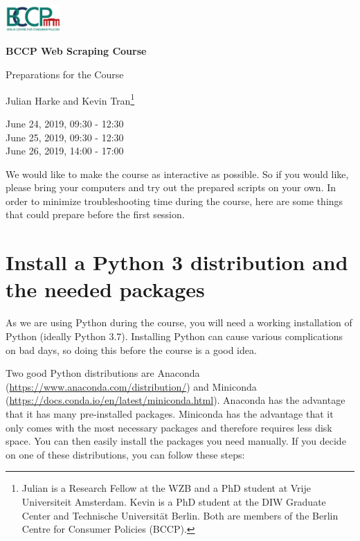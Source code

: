 \documentclass[a4paper]{article}
\begin{document}
\includegraphics[width=80px]{../misc/bccp_logo_transparent.png}
\vspace{1cm}

\begin{center}
\textbf{\Large BCCP Web Scraping Course} 

{\large Preparations for the Course}
\vspace{0.3cm}

Julian Harke and Kevin Tran\footnote{Julian is a Research Fellow at the WZB and a PhD student at Vrije Universiteit Amsterdam. Kevin is a PhD student at the DIW Graduate Center and Technische Universit\"at Berlin. Both are members of the Berlin Centre for Consumer Policies (BCCP).} \vspace{0.3cm}

June 24, 2019, 09:30 - 12:30 \\
June 25, 2019, 09:30 - 12:30 \\
June 26, 2019, 14:00 - 17:00
\end{center}

We would like to make the course as interactive as possible. So if you would like, please bring your computers and try out the prepared scripts on your own. In order to minimize troubleshooting time during the course, here are some things that could prepare before the first session.

\section{Install a Python 3 distribution and the needed packages}

As we are using Python during the course, you will need a working installation of Python (ideally Python 3.7). Installing Python can cause various complications on bad days, so doing this before the course is a good idea.

Two good Python distributions are Anaconda (\url{https://www.anaconda.com/distribution/}) and Miniconda (\url{https://docs.conda.io/en/latest/miniconda.html}). Anaconda has the advantage that it has many pre-installed packages. Miniconda has the advantage that it only comes with the most necessary packages and therefore requires less disk space. You can then easily install the packages you need manually. If you decide on one of these distributions, you can follow these steps:
\end{document}
